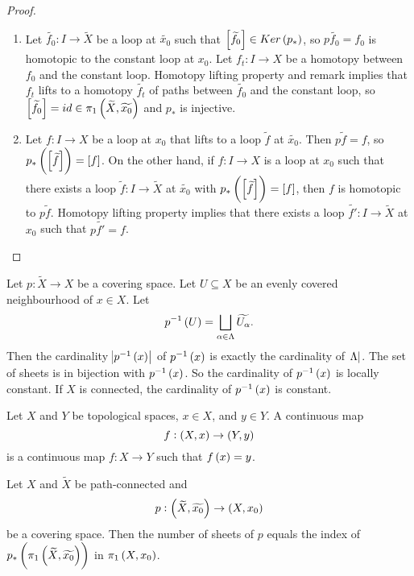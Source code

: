 \begin{proof}
\hfill
\begin{enumerate}
\item Let $ \widetilde{f_0} : I \to \widetilde{X} $ be a loop at $ \widetilde{x_0} $ such that $ \sbr{\widetilde{f_0}} \in Ker\br{p_*} $, so $ p\widetilde{f_0} = f_0 $ is homotopic to the constant loop at $ x_0 $. Let $ f_t : I \to X $ be a homotopy between $ f_0 $ and the constant loop. Homotopy lifting property and remark implies that $ f_t $ lifts to a homotopy $ \widetilde{f_t} $ of paths between $ \widetilde{f_0} $ and the constant loop, so $ \sbr{\widetilde{f_0}} = id \in \pi_1\br{\widetilde{X}, \widetilde{x_0}} $ and $ p_* $ is injective.
\item Let $ f : I \to X $ be a loop at $ x_0 $ that lifts to a loop $ \widetilde{f} $ at $ \widetilde{x_0} $. Then $ p\widetilde{f} = f $, so $ p_*\br{\sbr{\widetilde{f}}} = \sbr{f} $. On the other hand, if $ f : I \to X $ is a loop at $ x_0 $ such that there exists a loop $ \widetilde{f} : I \to \widetilde{X} $ at $ \widetilde{x_0} $ with $ p_*\br{\sbr{\widetilde{f}}} = \sbr{f} $, then $ f $ is homotopic to $ p\widetilde{f} $. Homotopy lifting property implies that there exists a loop $ \widetilde{f'} : I \to \widetilde{X} $ at $ x_0 $ such that $ p\widetilde{f'} = f $.
\end{enumerate}
\end{proof}

\pagebreak


Let $ p : \widetilde{X} \to X $ be a covering space. Let $ U \subseteq X $ be an evenly covered neighbourhood of $ x \in X $. Let
$$ p^{-1}\br{U} = \bigsqcup_{\alpha \in \Lambda} \widetilde{U_\alpha}. $$
Then the cardinality $ \abs{p^{-1}\br{x}} $ of $ p^{-1}\br{x} $ is exactly the cardinality of $ \abs{\Lambda} $. The set of sheets is in bijection with $ p^{-1}\br{x} $. So the cardinality of $ p^{-1}\br{x} $ is locally constant. If $ X $ is connected, the cardinality of $ p^{-1}\br{x} $ is constant.

\begin{notation*}
Let $ X $ and $ Y $ be topological spaces, $ x \in X $, and $ y \in Y $. A continuous map
$$ f : \br{X, x} \to \br{Y, y} $$
is a continuous map $ f : X \to Y $ such that $ f\br{x} = y $.
\end{notation*}

\begin{proposition}
Let $ X $ and $ \widetilde{X} $ be path-connected and
$$ p : \br{\widetilde{X}, \widetilde{x_0}} \to \br{X, x_0} $$
be a covering space. Then the number of sheets of $ p $ equals the index of $ p_*\br{\pi_1\br{\widetilde{X}, \widetilde{x_0}}} $ in $ \pi_1\br{X, x_0} $.
\end{proposition}

